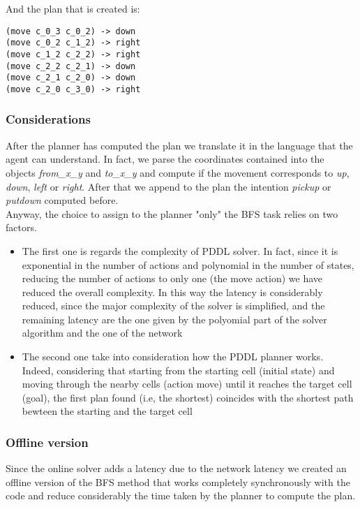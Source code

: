 \documentclass[a4paper, 11pt]{article}
\begin{document}
And the plan that is created is:
\begin{verbatim}
(move c_0_3 c_0_2) -> down
(move c_0_2 c_1_2) -> right
(move c_1_2 c_2_2) -> right
(move c_2_2 c_2_1) -> down
(move c_2_1 c_2_0) -> down
(move c_2_0 c_3_0) -> right
\end{verbatim}

\subsubsection{Considerations}

After the planner has computed the plan we translate it in the language that the agent can understand. In fact, we parse the coordinates contained into the objects \emph{from\_x\_y} and \emph{to\_x\_y} and compute if the movement corresponds to \emph{up}, \emph{down}, \emph{left} or \emph{right}. After that we append to the plan the intention \emph{pickup} or \emph{putdown} computed before.\\

Anyway, the choice to assign to the planner "only" the BFS task relies on two factors.
\begin{itemize}
    \item The first one is regards the complexity of PDDL solver. In fact, since it is exponential in the number of actions and polynomial in the number of states, reducing the number of actions to only one (the move action) we have reduced the overall complexity. In this way the latency is considerably reduced, since the major complexity of the solver is simplified, and the remaining latency are the one given by the polyomial part of the solver algorithm and the one of the network
    \item The second one take into consideration how the PDDL planner works. Indeed, considering that starting from the starting cell (initial state) and moving through the nearby cells (action move) until it reaches the target cell (goal), the first plan found (i.e, the shortest) coincides with the shortest path bewteen the starting and the target cell
\end{itemize}

\subsubsection{Offline version}

Since the online solver adds a latency due to the network latency we created an offline version of the BFS method that works completely synchronously with the code and reduce considerably the time taken by the planner to compute the plan.
\end{document}
